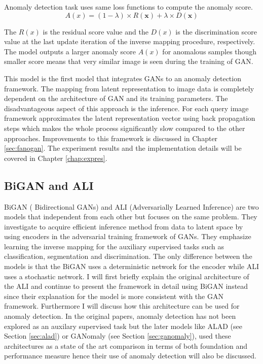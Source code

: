 Anomaly detection task uses same loss functions to compute the anomaly score. 
$$A(x) = (1 - \lambda ) \times R(\boldsymbol{x}) + \lambda \times D(\boldsymbol{x}) $$

The $R(x)$ is the residual score value and the $D(x)$ is the discrimination score value at the last
update iteration of the inverse mapping procedure, respectively. The model outputs a larger anomaly
score $A(x)$ for anomalous samples though smaller score means that very similar image is seen during
the training of GAN. 

This model is the first model that integrates GANs to an anomaly
detection framework. The mapping from latent representation to image data is completely dependent on
the architecture of GAN and its training parameters. The disadvantageous aspect of this approach
is the inference. For each query image framework approximates the latent representation vector using
back propagation steps which makes the whole process significantly slow compared to the other
approaches. Improvements to this framework is discussed in  Chapter
\ref{sec:fanogan}. The experiment results and the implementation details will be covered in
Chapter \ref{chap:expres}.

\subsection{BiGAN and ALI}
\label{sec:bigan}

 BiGAN ( Bidirectional GANs) \cite{Donahue2017AdversarialFL} and ALI
 (Adversarially Learned Inference) \cite{Dumoulin2017AdversariallyLI} are two models that
 independent from each other but focuses on the same problem. They investigate to acquire efficient
 inference method from data to latent space by using encoders in the adversarial training framework
 of GANs. They emphasize learning the inverse mapping for the auxiliary supervised tasks such as
 classification, segmentation and discrimination. The only difference between the models is that the
 BiGAN uses a deterministic network for the encoder while ALI uses a stochastic network. I will
 first briefly explain the original architecture of the ALI and continue to present the framework in
 detail using BiGAN instead since their explanation for the model is more consistent with the GAN
 framework. Furthermore I will discuss how this architecture can be used for anomaly detection. In
 the original papers, anomaly detection has not been explored as an auxilary supervised task but the
 later models like ALAD (see Section \ref{sec:alad}) or GANomaly (see Section \ref{sec:ganomaly}), used these
 architectures as a state of the art comparison in terms of both foundation and performance measure
 hence their use of anomaly detection will also be discussed.

